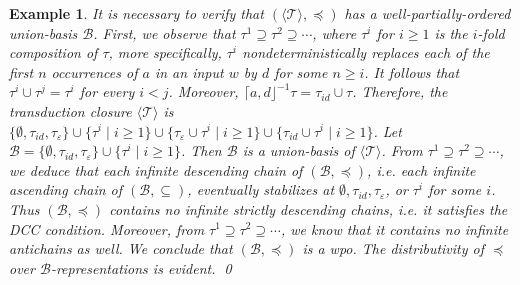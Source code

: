 \documentclass[preprint,12pt]{elsarticle}
\newtheorem{example}{Example}
\newcommand\TranSet{{\mathscr{T} }}
\newcommand\Tranbasis{{\mathscr{B} }}
\newcommand{\WSTrPDS}{\textsf{WSTrPDS}}
\begin{document}
\begin{example}
It is necessary to verify that $(\langle \TranSet \rangle, \preceq)$ has a well-partially-ordered union-basis $\Tranbasis$. First, we observe that $\tau^1 \supseteq \tau^2 \supseteq \cdots$, where $\tau^i$ for $i \ge 1$ is the $i$-fold composition of $\tau$, more specifically, $\tau^i$ nondeterministically replaces each of the first $n $ occurrences of $a$ in an input $w$ by $d$ for some $n \ge i$. It follows that $\tau^i \cup \tau^j = \tau^i$ for every $i < j$.
Moreover, $\lceil a, d \rfloor^{-1} \tau = \tau_{id} \cup \tau$. Therefore, the transduction closure $\langle \TranSet \rangle$ is $\{\emptyset, \tau_{id}, \tau_\varepsilon\} \cup \{\tau^i \mid i \ge 1\} \cup \{\tau_{\varepsilon} \cup \tau^i \mid i \ge 1\} \cup \{\tau_{id} \cup \tau^i \mid i \ge 1\}$. Let $\Tranbasis = \{\emptyset, \tau_{id}, \tau_\varepsilon\} \cup \{\tau^i \mid i \ge 1\}$. Then $\Tranbasis$ is a union-basis of $\langle \TranSet \rangle$. 
%
From $\tau^1 \supseteq \tau^2 \supseteq \cdots$, we deduce that each infinite descending chain of $(\Tranbasis, \preceq)$, i.e. each infinite ascending chain of $(\Tranbasis, \subseteq)$, eventually stabilizes at $\emptyset, \tau_{id}, \tau_\varepsilon$, or $\tau^i$ for some $i$. Thus $(\Tranbasis, \preceq)$ contains no infinite strictly descending chains, i.e. it satisfies the DCC condition. Moreover, from $\tau^1 \supseteq \tau^2 \supseteq \cdots$, we know that it contains no infinite antichains as well. We conclude that $(\Tranbasis, \preceq)$ is a wpo. The distributivity of $\preceq$ over $\Tranbasis$-representations is evident. \qed
%
\end{example}
\end{document}
